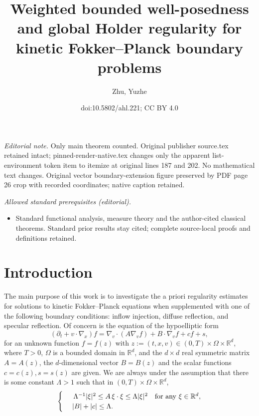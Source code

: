 \documentclass[10pt]{amsart}
\title{Weighted bounded well-posedness and global Holder regularity for kinetic Fokker--Planck boundary problems}
\author{Zhu, Yuzhe}
\date{doi:10.5802/ahl.221; CC BY 4.0}
\theoremstyle{definition}\newtheorem{defi}[theo]{Definition}\newtheorem{rema}[theo]{Remark}\newtheorem{exam}[theo]{Example}\newtheorem{exem}[theo]{Example}\newtheorem{nota}[theo]{Notation}
\newcommand*\R {\mathbb{R}}
\begin{document}
\maketitle
\noindent\textit{Editorial note.} Only main theorem counted. Original publisher source.tex retained intact; pinned-render-native.tex changes only the apparent list-environment token item to itemize at original lines 187 and 202. No mathematical text changes. Original vector boundary-extension figure preserved by PDF page 26 crop with recorded coordinates; native caption retained.\par\medskip
\noindent\textit{Allowed standard prerequisites (editorial).}\begin{itemize}
\item Standard functional analysis, measure theory and the author-cited classical theorems. Standard prior results stay cited; complete source-local proofs and definitions retained.
\end{itemize}\medskip

\pagebreak
\section{Introduction} 

The main purpose of this work is to investigate the a priori regularity estimates for solutions to kinetic Fokker--Planck equations when supplemented with one of the following boundary conditions: inflow injection, diffuse reflection, and specular reflection. Of concern is the equation of the hypoelliptic form
\begin{equation}\label{FP}
\left(\partial_t+v\cdot\nabla_x\right)f =\nabla_v\cdot\left(A\nabla_v f\right)+B\cdot\nabla_vf +cf + s,
\end{equation}
for an unknown function $f=f(z)$ with $z:=(t,x,v)\in(0,T)\times\Omega\times\R^d$, where $T>0$, $\Omega$ is a bounded domain in $\R^d$, and the $d\times d$ real symmetric matrix $A=A(z)$, the $d$-dimensional vector $B=B(z)$ and the scalar functions $c=c(z),s=s(z)$ are given. We are always under the assumption that there is some constant $\Lambda>1$ such that in $(0,T)\times\Omega\times\R^d$,
\begin{equation}\label{H}
\begin{cases}
\ &\,\Lambda^{-1}|\xi|^2\le A\,\xi\cdot\xi\le\Lambda|\xi|^2 {\quad\rm for\ any\ }\xi\in\R^d, \\
\ &|B|+|c|\le\Lambda. \\
\end{cases}
\end{equation}
\end{document}
